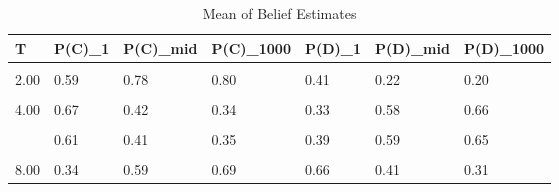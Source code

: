 \begin{table}[!h]
\centering
\caption{Mean of Belief Estimates}
\centering
\begin{tabular}[t]{lllllll}
\toprule
T & P(C)\_1 & P(C)\_mid & P(C)\_1000 & P(D)\_1 & P(D)\_mid & P(D)\_1000\\
\midrule
\cellcolor{gray!10}{1.00} & \cellcolor{gray!10}{0.75} & \cellcolor{gray!10}{0.95} & \cellcolor{gray!10}{0.95} & \cellcolor{gray!10}{0.25} & \cellcolor{gray!10}{0.05} & \cellcolor{gray!10}{0.05}\\
2.00 & 0.59 & 0.78 & 0.80 & 0.41 & 0.22 & 0.20\\
\cellcolor{gray!10}{3.00} & \cellcolor{gray!10}{0.58} & \cellcolor{gray!10}{0.25} & \cellcolor{gray!10}{0.25} & \cellcolor{gray!10}{0.42} & \cellcolor{gray!10}{0.75} & \cellcolor{gray!10}{0.75}\\
4.00 & 0.67 & 0.42 & 0.34 & 0.33 & 0.58 & 0.66\\
\cellcolor{gray!10}{5.00} & \cellcolor{gray!10}{0.62} & \cellcolor{gray!10}{0.39} & \cellcolor{gray!10}{0.31} & \cellcolor{gray!10}{0.38} & \cellcolor{gray!10}{0.61} & \cellcolor{gray!10}{0.69}\\
\addlinespace
6.00 & 0.61 & 0.41 & 0.35 & 0.39 & 0.59 & 0.65\\
\cellcolor{gray!10}{7.00} & \cellcolor{gray!10}{0.44} & \cellcolor{gray!10}{0.61} & \cellcolor{gray!10}{0.72} & \cellcolor{gray!10}{0.56} & \cellcolor{gray!10}{0.39} & \cellcolor{gray!10}{0.28}\\
8.00 & 0.34 & 0.59 & 0.69 & 0.66 & 0.41 & 0.31\\
\bottomrule
\end{tabular}
\end{table}